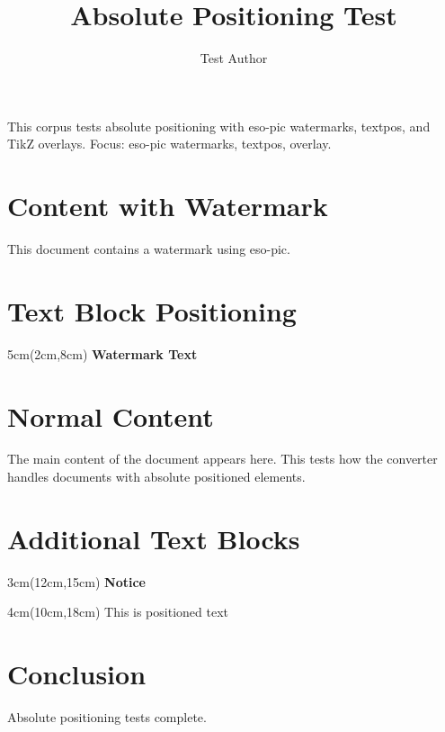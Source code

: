 \documentclass{article}
\title{Absolute Positioning Test}
\author{Test Author}
\begin{document}
\maketitle

\begin{abstrct}
This corpus tests absolute positioning with eso-pic watermarks, textpos,
and TikZ overlays.
Focus: eso-pic watermarks, textpos, overlay.
\end{abstrct}

\section{Content with Watermark}

This document contains a watermark using eso-pic.

\section{Text Block Positioning}

\begin{textblock*}{5cm}(2cm,8cm)
\textbf{Watermark Text}
\end{textblock*}

\section{Normal Content}

The main content of the document appears here. This tests how the converter
handles documents with absolute positioned elements.

\section{Additional Text Blocks}

\begin{textblock*}{3cm}(12cm,15cm)
\textbf{Notice}
\end{textblock*}

\begin{textblock*}{4cm}(10cm,18cm)
This is positioned text
\end{textblock*}

\section{Conclusion}

Absolute positioning tests complete.
\end{document}
